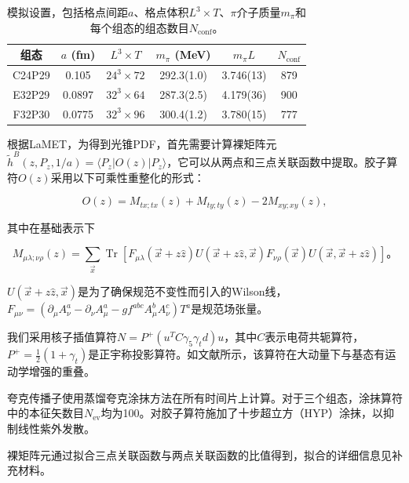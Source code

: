 \documentclass[12pt,a4paper]{ctexart}
\begin{document}
\begin{table}[H]
\centering
\caption{模拟设置，包括格点间距$a$、格点体积$L^3 \times T$、$\pi$介子质量$m_\pi$和每个组态的组态数目$N_{\text{conf}}$。}
\label{tab:ensembles}
\begin{tabular}{cccccc}
\toprule
组态 & $a$ (fm) & $L^3 \times T$ & $m_\pi$ (MeV) & $m_\pi L$ & $N_{\text{conf}}$ \\
\midrule
C24P29 & 0.105  & $24^3 \times 72$ & 292.3(1.0) & 3.746(13) & 879 \\
E32P29 & 0.0897 & $32^3 \times 64$ & 287.3(2.5) & 4.179(36) & 900 \\
F32P30 & 0.0775 & $32^3 \times 96$ & 300.4(1.2) & 3.780(15) & 777 \\
\bottomrule
\end{tabular}
\end{table}

根据LaMET，为得到光锥PDF，首先需要计算裸矩阵元$\tilde{h}^B(z, P_z, 1/a) = \langle P_z|O(z)|P_z\rangle$，它可以从两点和三点关联函数中提取。胶子算符$O(z)$采用以下可乘性重整化的形式\cite{Zhang2019,Balitsky2020}：

\begin{equation}
O(z) = M_{tx;tx}(z) + M_{ty;ty}(z) - 2M_{xy;xy}(z),
\label{eq:operator}
\end{equation}

其中在基础表示下

\begin{equation}
M_{\mu\lambda;\nu\rho}(z) = \sum_{\vec{x}} \operatorname{Tr}[F_{\mu\lambda}(\vec{x} + z\hat{z})U(\vec{x} + z\hat{z},\vec{x}) F_{\nu\rho}(\vec{x})U(\vec{x},\vec{x} + z\hat{z})]。
\label{eq:Mmunu}
\end{equation}

$U(\vec{x} + z\hat{z},\vec{x})$是为了确保规范不变性而引入的Wilson线，$F_{\mu\nu} = (\partial_\mu A^a_\nu - \partial_\nu A^a_\mu - g f^{abc} A^b_\mu A^c_\nu)T^a$是规范场张量。

我们采用核子插值算符$N = P^+(u^T C\gamma_5\gamma_t d)u$，其中$C$表示电荷共轭算符，$P^+ = \frac{1}{2}(1+\gamma_t)$是正宇称投影算符。如文献\cite{Zhang2025}所示，该算符在大动量下与基态有运动学增强的重叠。

夸克传播子使用蒸馏夸克涂抹方法\cite{Peardon2009}在所有时间片上计算。对于三个组态，涂抹算符中的本征矢数目$N_{\text{ev}}$均为100。对胶子算符施加了十步超立方（HYP）涂抹，以抑制线性紫外发散。

裸矩阵元通过拟合三点关联函数与两点关联函数的比值得到，拟合的详细信息见补充材料\cite{supplemental}。
\end{document}
